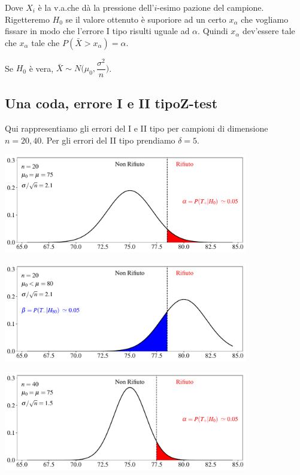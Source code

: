 \documentclass[12pt,openany]{book}
\theoremstyle{mio}
\theoremstyle{liscio}
\begin{document}
Dove $X_i$ è la v.a.\@ che dà la pressione dell'$i$-esimo pazione del campione. Rigetteremo $H_0$ se il valore ottenuto è suporiore ad un certo $x_\alpha$ che vogliamo fissare in modo che l'errore I tipo risulti uguale ad $\alpha$. Quindi $x_\alpha$ dev'essere tale che $x_\alpha$ tale che $P(\bar X>x_\alpha)=\alpha$.

Se $H_0$ è vera, $\bar X\sim N\bigg(\mu_0,\dfrac{\sigma^2}{n}\bigg)$.

% 



\clearpage\subsection{Una coda, errore I e II tipo\hfill Z-test}


Qui rappresentiamo gli errori del I e II tipo per campioni di dimensione $n=20, 40$. Per gli errori del II tipo prendiamo $\delta=5$.

\hfil\includegraphics[width=0.8\textwidth]{figure/Z-test_01.pdf}

\hfil\includegraphics[width=0.8\textwidth]{figure/Z-test_02.pdf}

\hfil\includegraphics[width=0.8\textwidth]{figure/Z-test_03.pdf}
\end{document}
